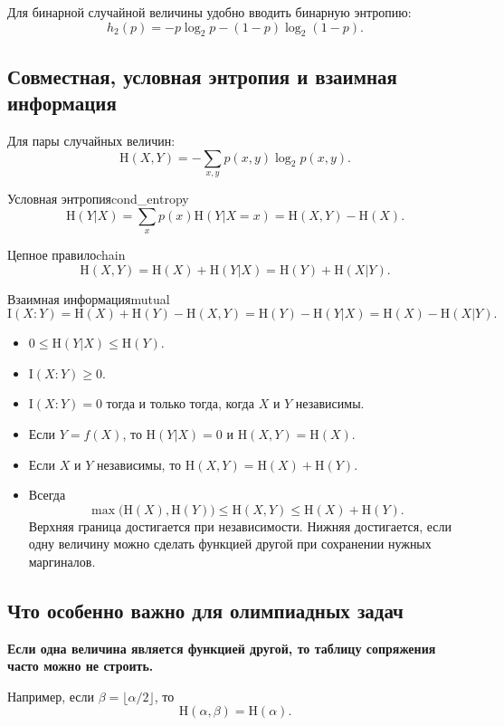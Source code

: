 \documentclass[12pt,a4paper]{article}
\renewcommand{\ge}{\geqslant}
\renewcommand{\le}{\leqslant}
\newcommand{\HH}{\mathrm{H}}
\newcommand{\II}{\mathrm{I}}
\begin{document}
Для бинарной случайной величины удобно вводить бинарную энтропию:
$$
h_2(p)=-p\log_2 p-(1-p)\log_2(1-p).
$$

\subsection{Совместная, условная энтропия и взаимная информация}

Для пары случайных величин:
$$
\HH(X,Y)=-\sum_{x,y} p(x,y)\log_2 p(x,y).
$$

\begin{definition}{Условная энтропия}{cond_entropy}
$$
\HH(Y|X)=\sum_x p(x)\HH(Y|X=x)=\HH(X,Y)-\HH(X).
$$
\end{definition}

\begin{theorem}{Цепное правило}{chain}
$$
\HH(X,Y)=\HH(X)+\HH(Y|X)=\HH(Y)+\HH(X|Y).
$$
\end{theorem}

\begin{definition}{Взаимная информация}{mutual}
$$
\II(X:Y)=\HH(X)+\HH(Y)-\HH(X,Y)=\HH(Y)-\HH(Y|X)=\HH(X)-\HH(X|Y).
$$
\end{definition}

\begin{insight}
\begin{itemize}[leftmargin=1.5em]
    \item $0\le \HH(Y|X)\le \HH(Y)$.
    \item $\II(X:Y)\ge 0$.
    \item $\II(X:Y)=0$ тогда и только тогда, когда $X$ и $Y$ независимы.
    \item Если $Y=f(X)$, то $\HH(Y|X)=0$ и $\HH(X,Y)=\HH(X)$.
    \item Если $X$ и $Y$ независимы, то $\HH(X,Y)=\HH(X)+\HH(Y)$.
    \item Всегда
    $$
    \max\bigl(\HH(X),\HH(Y)\bigr)\le \HH(X,Y)\le \HH(X)+\HH(Y).
    $$
    Верхняя граница достигается при независимости. Нижняя достигается, если одну величину можно сделать функцией другой при сохранении нужных маргиналов.
\end{itemize}
\end{insight}

\subsection{Что особенно важно для олимпиадных задач}

\begin{paradox}
\textbf{Если одна величина является функцией другой, то таблицу сопряжения часто можно не строить.}

Например, если $\beta=\lfloor \alpha/2\rfloor$, то
$$
\HH(\alpha,\beta)=\HH(\alpha).
$$
\end{paradox}
\end{document}

